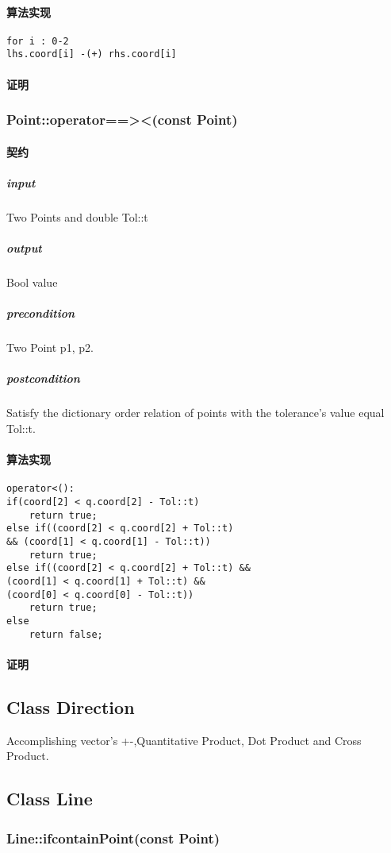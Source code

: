 \documentclass[a4paper]{book}
\numberwithin{equation}{chapter}
\theoremstyle{definition}
\begin{document}
\begin{multicols}{2}
\paragraph{算法实现}
\begin{lstlisting}
for i : 0-2
lhs.coord[i] -(+) rhs.coord[i]
\end{lstlisting}
\paragraph{证明}

\subsubsection{Point::operator==><(const Point)}
\paragraph{契约}
\subparagraph{input}
Two Points and double Tol::t
\subparagraph{output}
Bool value
\subparagraph{precondition}
Two Point p1, p2.
\subparagraph{postcondition}
Satisfy the dictionary order relation of points with the tolerance's value equal Tol::t.
\paragraph{算法实现}
\begin{lstlisting}
operator<():
if(coord[2] < q.coord[2] - Tol::t)
	return true;
else if((coord[2] < q.coord[2] + Tol::t)
&& (coord[1] < q.coord[1] - Tol::t))
	return true;
else if((coord[2] < q.coord[2] + Tol::t) &&
(coord[1] < q.coord[1] + Tol::t) &&
(coord[0] < q.coord[0] - Tol::t))
	return true;
else
	return false;

\end{lstlisting}
\paragraph{证明}

\subsection{Class Direction}

Accomplishing vector's +-,Quantitative Product, Dot Product and Cross Product.


\subsection{Class Line}
\subsubsection{Line::ifcontainPoint(const Point)}

\end{multicols}
\end{document}
